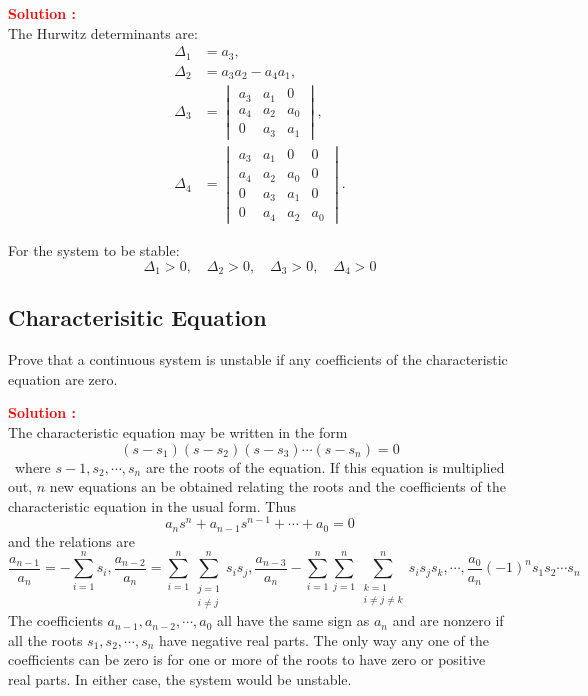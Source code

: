 \documentclass[12pt]{article}
\begin{document}
\textbf{\textcolor{red}{Solution :}} \\

The Hurwitz determinants are:
\begin{align*}
\Delta_1 &= a_3, \\
\Delta_2 &= a_3a_2 - a_4a_1, \\
\Delta_3 &= \begin{vmatrix} a_3 & a_1 & 0 \\ a_4 & a_2 & a_0 \\ 0 & a_3 & a_1 \end{vmatrix}, \\
\Delta_4 &= \begin{vmatrix} a_3 & a_1 & 0 & 0 \\ a_4 & a_2 & a_0 & 0 \\ 0 & a_3 & a_1 & 0 \\ 0 & a_4 & a_2 & a_0 \end{vmatrix}.
\end{align*}

For the system to be stable:
\[
\Delta_1 > 0, \quad \Delta_2 > 0, \quad \Delta_3 > 0, \quad \Delta_4 > 0
\]
\clearpage

\subsection{Characterisitic Equation}

Prove that a continuous system is unstable if any coefficients of the characteristic equation are zero.

\textbf{\textcolor{red}{Solution :}} \\
The characteristic equation may be written in the form
\begin{equation}
    (s-s_1)(s-s_2)(s-s_3)\cdots (s-s_n) = 0
\end{equation}\
where \(s-1,s_2,\cdots,s_n\) are the roots of the equation. If this equation is multiplied out, \(n\) new equations an be obtained relating the roots and the coefficients of the characteristic equation in the usual form. Thus
\begin{equation}
    a_n s^n + a_{n-1}s^{n-1} + \cdots + a_0 = 0
\end{equation}
and the relations are 
\begin{equation}
    \frac{a_{n-1}}{a_n} = - \sum_{i=1}^n s_i, \frac{a_{n-2}}{a_n} =  \sum_{i=1}^n \sum_{\substack{j=1 \\ i \neq j}}^n s_i s_j,\frac{a_{n-3}}{a_n} - \sum_{i=1}^n \sum_{j=1}^n \sum_{\substack{k=1 \\ i \neq j \neq k}}^n s_i s_j s_k, \cdots,\frac{a_0}{a_n}(-1)^n s_1 s_2 \cdots s_n
\end{equation}
The coefficients \(a_{n-1},a_{n-2},\cdots,a_0\) all have the same sign as \(a_n\) and are nonzero if all the roots \(s_1,s_2,\cdots,s_n\) have negative real parts. The only way any one of the coefficients can be zero is for one or more of the roots to have zero or positive real parts. In either case, the system would be unstable.
\clearpage
\end{document}
